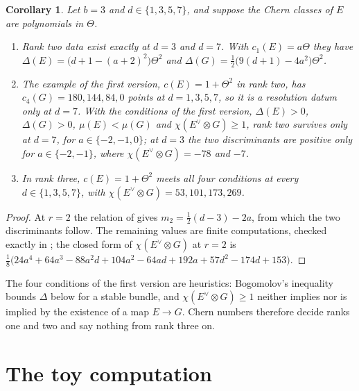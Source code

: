 \documentclass[11pt]{amsart}
\newtheorem{corollary}[theorem]{Corollary}
\theoremstyle{definition}
\theoremstyle{remark}
\begin{document}
\begin{corollary}\label{cor:examples}
Let $b=3$ and $d\in\{1,3,5,7\}$, and suppose the Chern classes of $E$ are
polynomials in $\Theta$.
\begin{enumerate}[label=\textup{(\roman*)},nosep]
\item Rank two data exist exactly at $d=3$ and $d=7$. With
  $c_{1}(E)=a\Theta$ they have $\Delta(E)=\bigl(d+1-(a+2)^{2}\bigr)\Theta^{2}$
  and $\Delta(G)=\tfrac12\bigl(9(d+1)-4a^{2}\bigr)\Theta^{2}$.
\item The example of the first version, $c(E)=1+\Theta^{2}$ in rank two, has
  $c_{4}(G)=180,144,84,0$ points at $d=1,3,5,7$, so it is a resolution datum
  only at $d=7$. With the conditions of the first version,
  $\Delta(E)>0$, $\Delta(G)>0$, $\mu(E)<\mu(G)$ and
  $\chi(E^{\vee}\otimes G)\ge1$, rank two survives only at $d=7$, for
  $a\in\{-2,-1,0\}$; at $d=3$ the two discriminants are positive only for
  $a\in\{-2,-1\}$, where $\chi(E^{\vee}\otimes G)=-78$ and $-7$.
\item In rank three, $c(E)=1+\Theta^{2}$ meets all four conditions at every
  $d\in\{1,3,5,7\}$, with $\chi(E^{\vee}\otimes G)=53,101,173,269$.
\end{enumerate}
\end{corollary}

\begin{proof}
At $r=2$ the relation of  gives
$m_{2}=\tfrac12(d-3)-2a$, from which the two discriminants follow. The
remaining values are finite computations, checked exactly in
; the closed form of $\chi(E^{\vee}\otimes G)$ at $r=2$ is
$\tfrac18\bigl(24a^{4}+64a^{3}-88a^{2}d+104a^{2}-64ad+192a+57d^{2}-174d
+153\bigr)$.
\end{proof}

The four conditions of the first version are heuristics: Bogomolov's
inequality bounds $\Delta$ below for a stable bundle, and
$\chi(E^{\vee}\otimes G)\ge1$ neither implies nor is implied by the existence
of a map $E\to G$. Chern numbers therefore decide ranks one and two and say
nothing from rank three on.

\section{The toy computation}\label{sec:toy}
\end{document}
